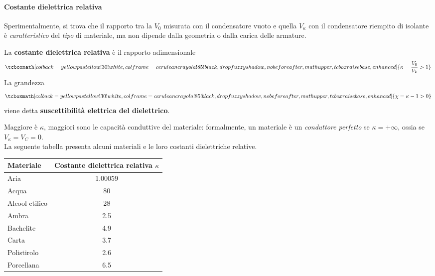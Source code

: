 \paragraph{Costante dielettrica relativa}
Sperimentalmente, si trova che il rapporto tra la \ddp $V_0$ misurata con il condensatore vuoto e quella $V_{\kappa}$ con il condensatore riempito di isolante è \textit{caratteristico} del \textit{tipo} di materiale, ma non dipende dalla geometria o dalla carica delle armature.
\begin{define}
	La \textbf{costante dielettrica relativa} è il rapporto adimensionale
	\begin{equation}
		\tcboxmath[colback=yellowpastellow!30!white,colframe=ceruleancrayola!85!black,drop fuzzy shadow, nobeforeafter, math upper, tcbox raise base, enhanced]{\kappa=\frac{V_0}{V_k}>1}
	\end{equation}
	La grandezza
	\begin{equation}
		\tcboxmath[colback=yellowpastellow!30!white,colframe=ceruleancrayola!85!black,drop fuzzy shadow, nobeforeafter, math upper, tcbox raise base, enhanced]{\chi=\kappa - 1>0}
	\end{equation}
	viene detta \textbf{suscettibilità elettrica del dielettrico}.
\end{define}
Maggiore è $\kappa$, maggiori sono le capacità conduttive del materiale: formalmente, un materiale è un \textit{conduttore perfetto} se $\kappa=+\infty$, ossia se $V_{\kappa}=V_C=0$.\\
La seguente tabella presenta alcuni materiali e le loro costanti dielettriche relative.
\begin{center}
	\begin{tabular}{lc}
		\textbf{Materiale}      & \textbf{Costante dielettrica relativa} $\kappa$\\\hline
		Aria           & \num{1,00059}                                                                    \\
		Acqua          & \num{80}                                                                         \\
		Alcool etilico & \num{28}                                                                         \\
		Ambra          & \num{2,5}                                                                        \\
		Bachelite      & \num{4,9}                                                                        \\
		Carta          & \num{3,7}                                                                        \\
		Polistirolo    & \num{2,6}                                                                        \\
		Porcellana     & \num{6,5}                                                                       
	\end{tabular}
\end{center}
